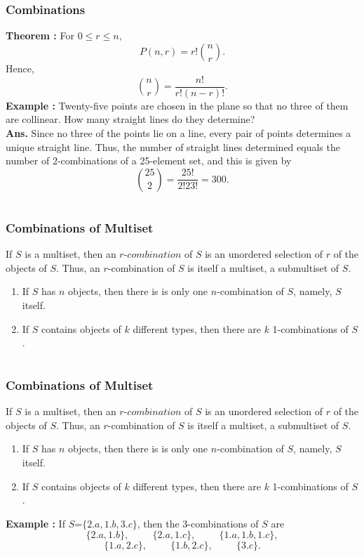\documentclass{beamer}
\begin{document}
\section{}
 \begin{frame}
\frametitle{Combinations}
{\bf Theorem :} For  $ 0 \le r \le n,$
$$P(n,r)=r!{\binom{n}{r}}.$$ 
Hence,  $$\binom{n}{r} = \frac{n!}{r!(n-r)!}.$$
\pause
{\bf Example :} Twenty-five points are chosen in the plane so that no three of them are collinear. How many straight lines do they determine?\\
 {\bf Ans.} Since no three of the points lie on a line, every pair of points determines a unique straight line. Thus, the number of straight lines determined equals the number of 2-combinations of a 25-element set, and this is given by
   $$\binom{25}{2}=\frac{25!}{2!23!}=300.$$
\end{frame}

\section{}
 \begin{frame}
\frametitle{Combinations of Multiset}
If $S$ is a multiset, then an $r$-$combination$ of $S$ is an unordered selection of $r$ of the objects of $S$. Thus, an $r$-combination  of $S$ is itself a multiset, a submultiset of $S$.
\begin{enumerate}
\item If $S$ has $n$ objects, then there is is only one $n$-combination of $S$, namely, $S$ itself.
\item If $S$ contains objects of $k$ different types, then there are $k$ 1-combinations of $S$.
\end{enumerate}
\end{frame}

\section{}
 \begin{frame}
\frametitle{Combinations of Multiset}
If $S$ is a multiset, then an $r$-$combination$ of $S$ is an unordered selection of $r$ of the objects of $S$. Thus, an $r$-combination  of $S$ is itself a multiset, a submultiset of $S$.
\begin{enumerate}
\item If $S$ has $n$ objects, then there is is only one $n$-combination of $S$, namely, $S$ itself.
\item If $S$ contains objects of $k$ different types, then there are $k$ 1-combinations of $S$.
\end{enumerate}
{\bf Example :} If $S$=$\{2.a, 1.b, 3.c \}$, then the 3-combinations of $S$ are 
$$\{2.a,1.b\},\hspace{1cm}\{2.a,1.c\},\hspace{1cm}\{1.a,1.b,1.c\},$$
$$\{1.a,2.c\},\hspace{1cm}\{1.b,2.c\},\hspace{1cm}\{3.c\}.$$
\end{frame}
\end{document}
